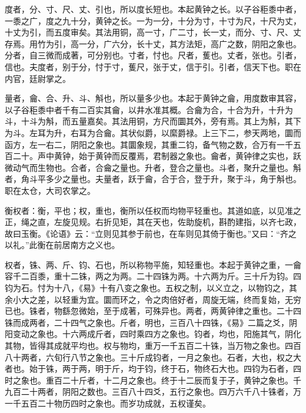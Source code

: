 \documentclass[12pt,UTF8]{ctexbook}
\begin{document}
度者，分、寸、尺、丈、引也，所以度长短也。本起黄钟之长。以子谷秬黍中者，一黍之广，度之九十分，黄钟之长。一为一分，十分为寸，十寸为尺，十尺为丈，十丈为引，而五度审矣。其法用铜，高一寸，广二寸，长一丈，而分、寸、尺、丈存焉。用竹为引，高一分，广六分，长十丈，其方法矩，高广之数，阴阳之象也。分者，自三微而成著，可分别也。寸者，忖也。尺者，蒦也。丈者，张也。引者，信也。夫度者，别于分，忖于寸，蒦尺，张于丈，信于引。引者，信天下也。职在内官，廷尉掌之。



量者，龠、合、升、斗、斛也，所以量多少也。本起于黄钟之龠，用度数审其容，以子谷秬黍中者千有二百实其龠，以井水准其概。合龠为合，十合为升，十升为斗，十斗为斛，而五量嘉矣。其法用铜，方尺而圜其外，旁有焉。其上为斛，其下为斗。左耳为升，右耳为合龠。其状似爵，以縻爵禄。上三下二，参天两地，圜而函方，左一右二，阴阳之象也。其圜象规，其重二钧，备气物之数，合万有一千五百二十。声中黄钟，始于黄钟而反覆焉，君制器之象也。龠者，黄钟律之实也，跃微动气而生物也。合者，合龠之量也。升者，登合之量也。斗者，聚升之量也。斛者，角斗平多少之量也。夫量者，跃于龠，合于合，登于升，聚于斗，角于斛也。职在太仓，大司农掌之。



衡权者：衡，平也；权，重也，衡所以任权而均物平轻重也。其道如底，以见准之正，绳之直，左旋见规。右折见矩，其在天也，佐助旋机，斟酌建指，以齐七政，故曰玉衡。《论语》云：“立则见其参于前也，在车则见其倚于衡也。”又曰：“齐之以礼。”此衡在前居南方之义也。



权者，铢、两、斤、钧、石也，所以称物平施，知轻重也。本起于黄钟之重，一龠容千二百黍，重十二铢，两之为两。二十四铢为两。十六两为斤。三十斤为钧。四钧为石。忖为十八，《易》十有八变之象也。五权之制，以义立之，以物钧之，其余小大之差，以轻重为宜。圜而环之，令之肉倍好者，周旋无端，终而复始，无穷已也。铢者，物繇忽微始，至于成著，可殊异也。两者，两黄钟律之重也。二十四铢而成两者，二十四气之象也。斤者，明也，三百八十四铢，《易》二篇之爻，阴阳变动之象也。十六两成斤者，四时乘四方之象也。钧者，均也，阳施其气，阴化其物，皆得其成就平均也。权与物均，重万一千五百二十铢，当万物之象也。四百八十两者，六旬行八节之象也。三十斤成钧者，一月之象也。石者，大也，权之大者也。始于铢，两于两，明于斤，均于钧，终于石，物终石大也。四钧为石者，四时之象也。重百二十斤者，十二月之象也。终于十二辰而复于子，黄钟之象也。千九百二十两者，阴阳之数也。三百八十四爻，五行之象也。四万六千八十铢者，万一千五百二十物历四时之象也。而岁功成就，五权谨矣。
\end{document}
